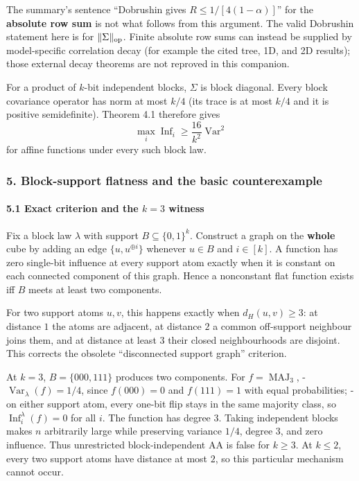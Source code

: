 The summary's sentence ``Dobrushin gives \(R\le1/[4(1-\alpha)]\)'' for the \textbf{absolute row sum} is not what follows from this argument. The valid Dobrushin statement here is for \(\|\Sigma\|_{\rm op}\). Finite absolute row sums can instead be supplied by model-specific correlation decay (for example the cited tree, 1D, and 2D results); those external decay theorems are not reproved in this companion.

For a product of \(k\)-bit independent blocks, \(\Sigma\) is block diagonal. Every block covariance operator has norm at most \(k/4\) (its trace is at most \(k/4\) and it is positive semidefinite). Theorem 4.1 therefore gives
\[\max_i\operatorname{Inf}_i\ge\frac{16}{k^2}\operatorname{Var}^2\]
for affine functions under every such block law.

\subsubsection{5. Block-support flatness and the basic counterexample}\label{block-support-flatness-and-the-basic-counterexample}

\paragraph{\texorpdfstring{5.1 Exact criterion and the \(k=3\) witness}{5.1 Exact criterion and the k=3 witness}}\label{exact-criterion-and-the-k3-witness}

Fix a block law \(\lambda\) with support \(B\subseteq\{0,1\}^k\). Construct a graph on the \textbf{whole} cube by adding an edge \(\{u,u^{\oplus i}\}\) whenever \(u\in B\) and \(i\in[k]\). A function has zero single-bit influence at every support atom exactly when it is constant on each connected component of this graph. Hence a nonconstant flat function exists iff \(B\) meets at least two components.

For two support atoms \(u,v\), this happens exactly when \(d_H(u,v)\ge3\): at distance \(1\) the atoms are adjacent, at distance \(2\) a common off-support neighbour joins them, and at distance at least \(3\) their closed neighbourhoods are disjoint. This corrects the obsolete ``disconnected support graph'' criterion.

At \(k=3\), \(B=\{000,111\}\) produces two components. For \(f=\operatorname{MAJ}_3\),
- \(\operatorname{Var}_\lambda(f)=1/4\), since \(f(000)=0\) and \(f(111)=1\) with equal probabilities;
- on either support atom, every one-bit flip stays in the same majority class, so \(\operatorname{Inf}_i^\lambda(f)=0\) for all \(i\).
The function has degree \(3\). Taking independent blocks makes \(n\) arbitrarily large while preserving variance \(1/4\), degree \(3\), and zero influence. Thus unrestricted block-independent AA is false for \(k\ge3\). At \(k\le2\), every two support atoms have distance at most \(2\), so this particular mechanism cannot occur.

